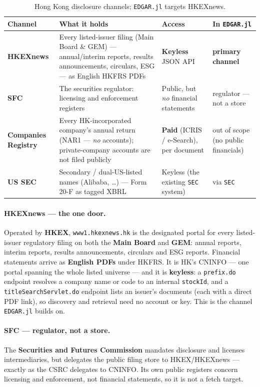 \documentclass[11pt,a4paper]{report}
\begin{document}
\begin{table}[h]
\centering
\small
\caption{Hong Kong disclosure channels; \texttt{EDGAR.jl} targets HKEXnews.}
\label{tab:hk-repos}
\begin{tabular}{@{}p{}p{}p{}p{}@{}}
\toprule
\textbf{Channel} & \textbf{What it holds} & \textbf{Access} & \textbf{In \texttt{EDGAR.jl}} \\
\midrule
\textbf{HKEXnews} & Every listed-issuer filing (Main Board \& GEM) --- annual/interim reports, results
  announcements, circulars, ESG --- as English HKFRS PDFs & \textbf{Keyless} JSON API & \textbf{primary
  channel} \\
\textbf{SFC} & The securities regulator: licensing and enforcement registers & Public, but \emph{no}
  financial statements & regulator --- not a store \\
\textbf{Companies Registry} & Every HK-incorporated company's annual return (NAR1 --- \emph{no} accounts);
  private-company accounts are not filed publicly & \textbf{Paid} (ICRIS / e-Search), per document & out of
  scope (no public financials) \\
\textbf{US SEC} & Secondary / dual-US-listed names (Alibaba, \ldots) --- Form 20-F as tagged XBRL & Keyless
  (the existing \texttt{SEC} system) & via \texttt{SEC} \\
\bottomrule
\end{tabular}
\end{table}

\paragraph{HKEXnews --- the one door.} Operated by \textbf{HKEX}, \texttt{www1.hkexnews.hk} is the designated
portal for every listed-issuer regulatory filing on both the \textbf{Main Board} and \textbf{GEM}: annual
reports, interim reports, results announcements, circulars and ESG reports. Financial statements arrive as
\textbf{English PDFs} under HKFRS. It is HK's CNINFO --- one portal spanning the whole listed universe --- and
it is \textbf{keyless}: a \texttt{prefix.do} endpoint resolves a company name or code to an internal
\texttt{stockId}, and a \texttt{titleSearchServlet.do} endpoint lists an issuer's documents (each with a
direct PDF link), so discovery and retrieval need no account or key. This is the channel \texttt{EDGAR.jl}
builds on.

\paragraph{SFC --- regulator, not a store.} The \textbf{Securities and Futures Commission} mandates disclosure
and licenses intermediaries, but delegates the public filing store to HKEX/HKEXnews --- exactly as the CSRC
delegates to CNINFO. Its own public registers concern licensing and enforcement, not financial statements, so
it is not a fetch target.
\end{document}
